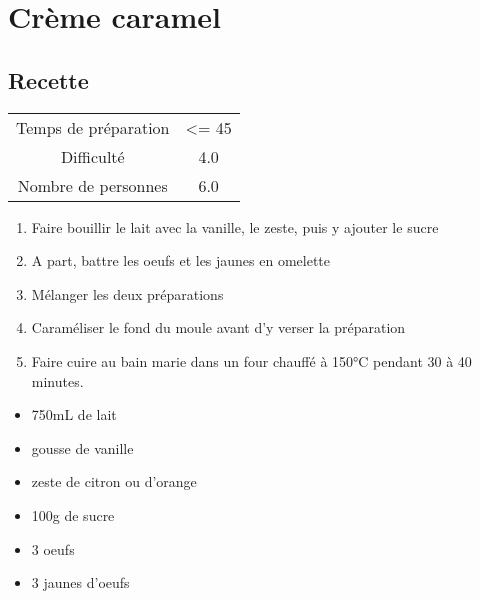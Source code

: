 \newpage
\section{Crème caramel}
    \label{sec:Crème caramel}
    \subsection{Recette}
    \vspace{1cm}


    \begin{center}
        \begin{tabular}{c|c}
            Temps de préparation & <= 45 \\
            Difficulté & 4.0 \\
            Nombre de personnes & 6.0 
        \end{tabular}
    \end{center}{}

    \vspace{1cm}
    \hline
    \vspace{1cm}

    \begin{minipage}{.7\textwidth}
        \begin{enumerate}
            \item Faire bouillir le lait avec la vanille, le zeste, puis y ajouter le sucre
	    \item A part, battre les oeufs et les jaunes en omelette
	    \item Mélanger les deux préparations
	    \item Caraméliser le fond du moule avant d'y verser la préparation
	    \item Faire cuire au bain marie dans un four chauffé à 150°C pendant 30 à 40 minutes.

        \end{enumerate}
    \end{minipage}
    \begin{minipage}{.3\textwidth}
        \begin{flushleft}
        \begin{itemize}
            \item 750mL de lait
	    \item gousse de vanille
	    \item zeste de citron ou d'orange
	    \item 100g de sucre
	    \item 3 oeufs
	    \item 3 jaunes d'oeufs

        \end{itemize}
        \end{flushleft}
    \end{minipage}
    
